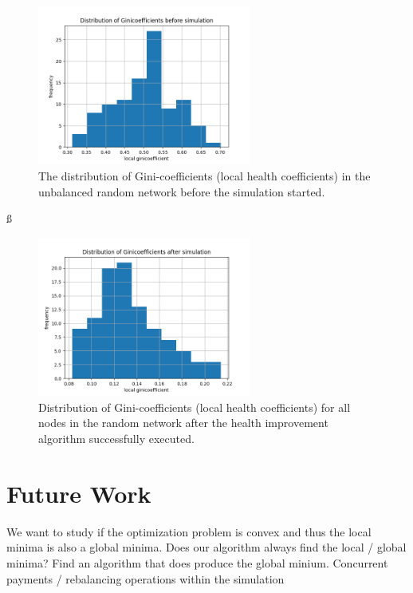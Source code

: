 \documentclass[a4paper]{paper}
\begin{document}
\begin{figure}
 \centering
 \includegraphics[width=7cm]{code/results/routabilityTest/1574847007_ginicoefficients_start.png}
 \caption{The distribution of Gini-coefficients (local health coefficients) in the unbalanced random network before the simulation started.}
 \label{fig:giniStart}
\end{figure}ß
\begin{figure}
 \centering
 \includegraphics[width=7cm]{code/results/routabilityTest/1574847007_ginicoefficients_end.png}
 \caption{Distribution of Gini-coefficients (local health coefficients) for all nodes in the random network after the health improvement algorithm successfully executed.}
 \label{fig:giniEnd}
\end{figure}




\section{Future Work}

We want to study if the optimization problem is convex and thus the local minima is also a global minima.
Does our algorithm always find the local / global minima?
Find an algorithm that does produce the global minium.
Concurrent payments / rebalancing operations within the simulation
\end{document}
